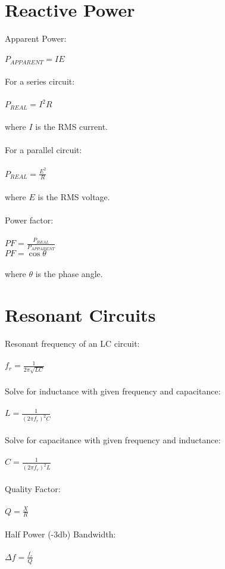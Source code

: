 \documentclass[10pt]{article}
\begin{document}
\section*{Reactive Power}
Apparent Power:\\\\
$P_{APPARENT} = IE$\\\\
For a series circuit:\\\\
$P_{REAL} = I^2R$\\\\
where $I$ is the RMS current.\\\\
For a parallel circuit:\\\\
$P_{REAL} = \frac{E^2}{R}$\\\\
where $E$ is the RMS voltage.\\\\
Power factor:\\\\
$PF = \frac{P_{REAL}}{P_{APPARENT}}$\\
$PF = \cos\theta$\\\\
where $\theta$ is the phase angle.
\section*{Resonant Circuits}
Resonant frequency of an LC circuit:\\\\
$f_r = \frac{1}{2\pi\sqrt{LC}}$\\\\
Solve for inductance with given frequency and capacitance:\\\\
$L=\frac{1}{(2\pi f_r)^2C}$\\\\
Solve for capacitance with given frequency and inductance:\\\\
$C=\frac{1}{(2\pi f_r)^2L}$\\\\
Quality Factor:\\\\
$Q = \frac{X}{R}$\\\\
Half Power (-3db) Bandwidth:\\\\
$\Delta f = \frac{f_r}{Q}$
\end{document}
